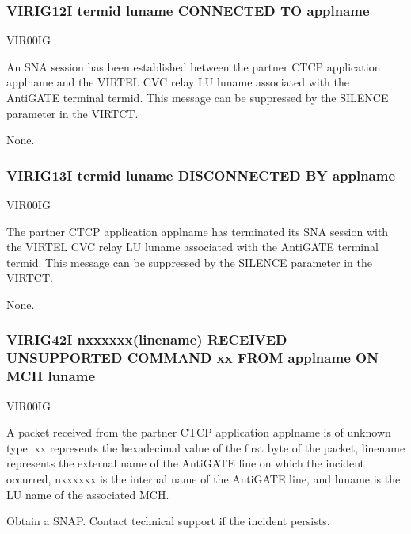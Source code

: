\documentclass[letterpaper,10pt,english]{sphinxmanual}
\begin{document}
\subsubsection{VIRIG12I termid luname CONNECTED TO applname}
\label{\detokenize{messages:virig12i-termid-luname-connected-to-applname}}\begin{description}
\sphinxAtStartPar
VIR00IG

\sphinxAtStartPar
An SNA session has been established between the partner CTCP application applname and the VIRTEL CVC relay LU luname associated with the AntiGATE terminal termid. This message can be suppressed by the SILENCE parameter in the VIRTCT.

\sphinxAtStartPar
None.

\end{description}


\subsubsection{VIRIG13I termid luname DISCONNECTED BY applname}
\label{\detokenize{messages:virig13i-termid-luname-disconnected-by-applname}}\begin{description}
\sphinxAtStartPar
VIR00IG

\sphinxAtStartPar
The partner CTCP application applname has terminated its SNA session with the VIRTEL CVC relay LU luname associated with the AntiGATE terminal termid. This message can be suppressed by the SILENCE parameter in the VIRTCT.

\sphinxAtStartPar
None.

\end{description}


\subsubsection{VIRIG42I n\sphinxhyphen{}xxxxxx(linename) RECEIVED UNSUPPORTED COMMAND xx FROM applname ON MCH luname}
\label{\detokenize{messages:virig42i-n-xxxxxx-linename-received-unsupported-command-xx-from-applname-on-mch-luname}}\begin{description}
\sphinxAtStartPar
VIR00IG

\sphinxAtStartPar
A packet received from the partner CTCP application applname is of unknown type. xx represents the hexadecimal value of the first byte of the packet, linename represents the external name of the AntiGATE line on which the incident occurred, n\sphinxhyphen{}xxxxxx is the internal name of the AntiGATE line, and luname is the LU name of the associated MCH.

\sphinxAtStartPar
Obtain a SNAP. Contact technical support if the incident persists.

\end{description}
\end{document}
